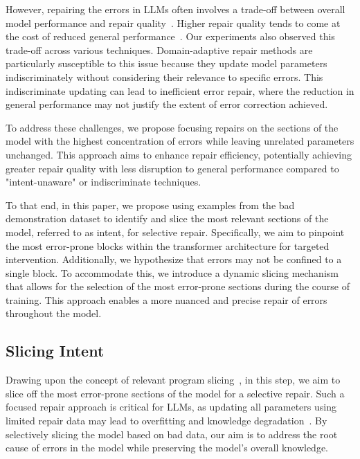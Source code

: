 However, repairing the errors in LLMs often involves a trade-off between overall model performance and repair quality~\cite{korbak2023pretraining,wang2022exploring}. Higher repair quality tends to come at the cost of reduced general performance~\cite{ding2022delta}. Our experiments also observed this trade-off across various techniques. Domain-adaptive repair methods are particularly susceptible to this issue because they update model parameters indiscriminately without considering their relevance to specific errors. This indiscriminate updating can lead to inefficient error repair, where the reduction in general performance may not justify the extent of error correction achieved.

To address these challenges, we propose focusing repairs on the sections of the model with the highest concentration of errors while leaving unrelated parameters unchanged. This approach aims to enhance repair efficiency, potentially achieving greater repair quality with less disruption to general performance compared to "intent-unaware" or indiscriminate techniques.

To that end, in this paper, we propose using examples from the bad demonstration dataset to identify and slice the most relevant sections of the model, referred to as intent, for selective repair. Specifically, we aim to pinpoint the most error-prone blocks within the transformer architecture for targeted intervention. Additionally, we hypothesize that errors may not be confined to a single block. To accommodate this, we introduce a dynamic slicing mechanism that allows for the selection of the most error-prone sections during the course of training. This approach enables a more nuanced and precise repair of errors throughout the model. 








\subsection{Slicing Intent}

Drawing upon the concept of relevant program slicing~\cite{weiser1984program}, in this step, we aim to slice off the most error-prone sections of the model for a selective repair. Such a focused repair approach is critical for LLMs, as updating all parameters using limited repair data may lead to overfitting and knowledge degradation~\cite{ding2022delta}. By selectively slicing the model based on bad data, our aim is to address the root cause of errors in the model while preserving the model's overall knowledge.

